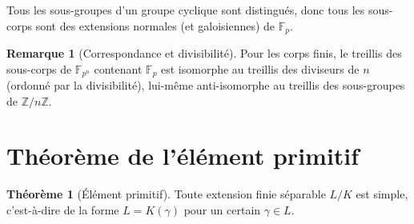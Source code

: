 \documentclass[12pt,a4paper,openany]{book}
\theoremstyle{definition}
\newtheorem{theoreme}{Théorème}[chapter]
\newtheorem{remarque}{Remarque}[chapter]
\newcommand{\Z}{\mathbb{Z}}
\newcommand{\F}{\mathbb{F}}
\begin{document}
\noindent
Tous les sous-groupes d'un groupe cyclique sont distingués, donc tous les
sous-corps sont des extensions normales (et galoisiennes) de $\F_p$.

\begin{remarque}[Correspondance et divisibilité]\label{rem:treillis-corps-finis}
Pour les corps finis, le treillis des sous-corps de $\F_{p^n}$ contenant
$\F_p$ est isomorphe au treillis des diviseurs de $n$ (ordonné par la
divisibilité), lui-même anti-isomorphe au treillis des sous-groupes de
$\Z/n\Z$.
\end{remarque}

\section{Théorème de l'élément primitif}\label{sec:element-primitif}

\begin{theoreme}[Élément primitif]\label{thm:element-primitif}
Toute extension finie séparable $L/K$ est simple, c'est-à-dire de la forme
$L = K(\gamma)$ pour un certain $\gamma \in L$.
\end{theoreme}
\end{document}
